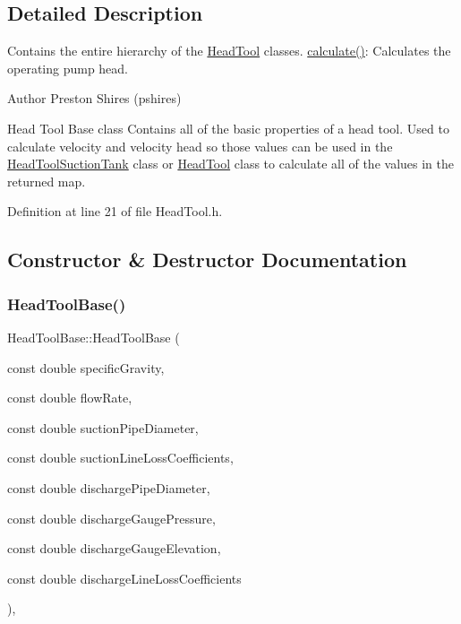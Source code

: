 \subsection{Detailed Description}
Contains the entire hierarchy of the \hyperlink{class_head_tool}{Head\+Tool} classes. \hyperlink{class_head_tool_base_ab8df8f908827ce45dc5e769ea0e10f0b}{calculate()}\+: Calculates the operating pump head. 

\begin{DoxyAuthor}{Author}
Preston Shires (pshires) 
\end{DoxyAuthor}
Head Tool Base class Contains all of the basic properties of a head tool. Used to calculate velocity and velocity head so those values can be used in the \hyperlink{class_head_tool_suction_tank}{Head\+Tool\+Suction\+Tank} class or \hyperlink{class_head_tool}{Head\+Tool} class to calculate all of the values in the returned map. 

Definition at line 21 of file Head\+Tool.\+h.



\subsection{Constructor \& Destructor Documentation}
\mbox{\label{class_head_tool_base_ae5bb2325e1266c64b16937d964aea14f}} 
\subsubsection{\texorpdfstring{Head\+Tool\+Base()}{HeadToolBase()}}
{\footnotesize\ttfamily Head\+Tool\+Base\+::\+Head\+Tool\+Base (\begin{DoxyParamCaption}\item[{const double}]{specific\+Gravity,  }\item[{const double}]{flow\+Rate,  }\item[{const double}]{suction\+Pipe\+Diameter,  }\item[{const double}]{suction\+Line\+Loss\+Coefficients,  }\item[{const double}]{discharge\+Pipe\+Diameter,  }\item[{const double}]{discharge\+Gauge\+Pressure,  }\item[{const double}]{discharge\+Gauge\+Elevation,  }\item[{const double}]{discharge\+Line\+Loss\+Coefficients }\end{DoxyParamCaption})\hspace{0.3cm}{\ttfamily [inline]}, {\ttfamily [protected]}}

